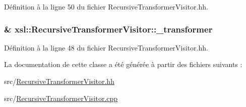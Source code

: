 Définition à la ligne 50 du fichier RecursiveTransformerVisitor.hh.

\hypertarget{classxsl_1_1_recursive_transformer_visitor_a745c0d86fe855949ec55b4c872b02753}{
\subsubsection[{\_\-transformer}]{\& {\bf xsl::RecursiveTransformerVisitor::\_\-transformer}}}
\label{classxsl_1_1_recursive_transformer_visitor_a745c0d86fe855949ec55b4c872b02753}


Définition à la ligne 48 du fichier RecursiveTransformerVisitor.hh.



La documentation de cette classe a été générée à partir des fichiers suivants :\begin{DoxyCompactItemize}
\item 
src/\hyperlink{_recursive_transformer_visitor_8hh}{RecursiveTransformerVisitor.hh}\item 
src/\hyperlink{_recursive_transformer_visitor_8cpp}{RecursiveTransformerVisitor.cpp}\end{DoxyCompactItemize}
